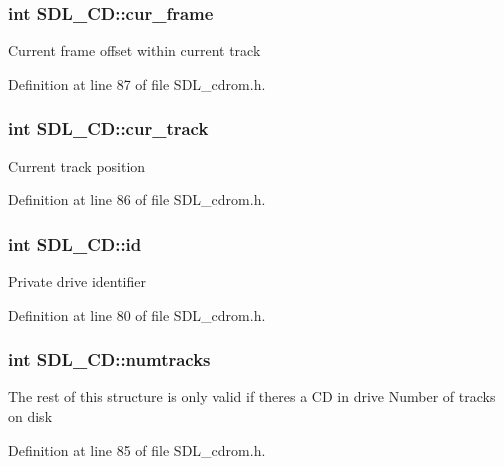 \subsubsection[{cur\+\_\+frame}]{\setlength{\rightskip}{0pt plus 5cm}int S\+D\+L\+\_\+\+C\+D\+::cur\+\_\+frame}\label{struct_s_d_l___c_d_a42123aeca413aa581c1403843d1a5809}
Current frame offset within current track 

Definition at line 87 of file S\+D\+L\+\_\+cdrom.\+h.

\hypertarget{struct_s_d_l___c_d_afe5a3ca65be47b34c72ac21ce28de31e}{}
\subsubsection[{cur\+\_\+track}]{\setlength{\rightskip}{0pt plus 5cm}int S\+D\+L\+\_\+\+C\+D\+::cur\+\_\+track}\label{struct_s_d_l___c_d_afe5a3ca65be47b34c72ac21ce28de31e}
Current track position 

Definition at line 86 of file S\+D\+L\+\_\+cdrom.\+h.

\hypertarget{struct_s_d_l___c_d_ab48f9cbecf78bc689649d877eceba103}{}
\subsubsection[{id}]{\setlength{\rightskip}{0pt plus 5cm}int S\+D\+L\+\_\+\+C\+D\+::id}\label{struct_s_d_l___c_d_ab48f9cbecf78bc689649d877eceba103}
Private drive identifier 

Definition at line 80 of file S\+D\+L\+\_\+cdrom.\+h.

\hypertarget{struct_s_d_l___c_d_ade87d0c7e217291fb1f1a53d03e1bfdf}{}
\subsubsection[{numtracks}]{\setlength{\rightskip}{0pt plus 5cm}int S\+D\+L\+\_\+\+C\+D\+::numtracks}\label{struct_s_d_l___c_d_ade87d0c7e217291fb1f1a53d03e1bfdf}
The rest of this structure is only valid if there\textquotesingle{}s a C\+D in drive Number of tracks on disk 

Definition at line 85 of file S\+D\+L\+\_\+cdrom.\+h.

